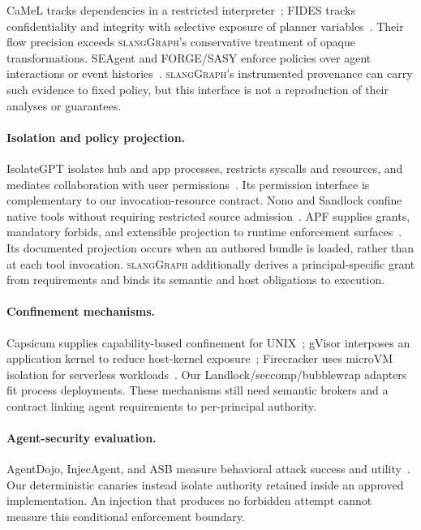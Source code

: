 \documentclass[letterpaper,twocolumn,10pt]{article}
\newcommand{\sys}{\textsc{slangGraph}\xspace}
\begin{document}
CaMeL tracks dependencies in a restricted interpreter~\cite{camel}; FIDES
tracks confidentiality and integrity with selective exposure of planner
variables~\cite{fides}. Their flow precision exceeds \sys's conservative
treatment of opaque transformations. SEAgent and FORGE/SASY enforce policies
over agent interactions or event histories~\cite{seagent,forge}. \sys's
instrumented provenance can carry such evidence to fixed policy, but this
interface is not a reproduction of their analyses or guarantees.

\paragraph{Isolation and policy projection.}
IsolateGPT isolates hub and app processes, restricts syscalls and resources,
and mediates collaboration with user permissions~\cite{isolategpt}. Its
permission interface is complementary to our invocation-resource contract.
Nono and Sandlock confine native tools without requiring restricted source
admission~\cite{nono,sandlock}. APF supplies grants, mandatory forbids, and
extensible projection to runtime enforcement surfaces~\cite{apf,apfprojection}.
Its documented projection occurs when an authored bundle is loaded, rather
than at each tool invocation. \sys additionally derives a principal-specific
grant from requirements and binds its semantic and host obligations to execution.

\paragraph{Confinement mechanisms.}
Capsicum supplies capability-based confinement for UNIX~\cite{capsicum};
gVisor interposes an application kernel to reduce host-kernel exposure~\cite{gvisor};
Firecracker uses microVM isolation for serverless workloads~\cite{firecracker}.
Our Landlock/seccomp/bubblewrap adapters fit process deployments. These mechanisms
still need semantic brokers and a contract linking agent requirements to
per-principal authority.

\paragraph{Agent-security evaluation.}
AgentDojo, InjecAgent, and ASB measure behavioral attack success and
utility~\cite{agentdojo,injecagent,asb}. Our deterministic canaries instead isolate
authority retained inside an approved implementation. An injection that produces
no forbidden attempt cannot measure this conditional enforcement boundary.
\end{document}
